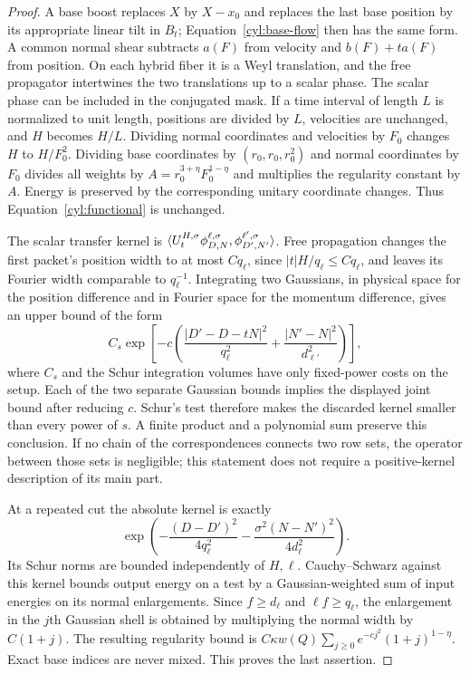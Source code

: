 \begin{proof}
A base boost replaces $X$ by $X-x_0$ and replaces the last base position
by its appropriate linear tilt in $B_t$; Equation~\eqref{cyl:base-flow}
then has the same form.  A common normal shear subtracts
$a(F)$ from velocity and $b(F)+ta(F)$ from position.  On each hybrid
fiber it is a Weyl translation, and the free propagator intertwines the
two translations up to a scalar phase.  The scalar phase can be included
in the conjugated mask.  If a time interval of length $L$ is normalized
to unit length, positions are divided by $L$, velocities are unchanged,
and $H$ becomes $H/L$.  Dividing normal coordinates and velocities by
$F_0$ changes $H$ to $H/F_0^2$.  Dividing base coordinates by
$(r_0,r_0,r_0^2)$ and normal coordinates by $F_0$ divides all weights
by $A=r_0^{3+\eta}F_0^{1-\eta}$ and multiplies the regularity constant
by $A$.  Energy is preserved by the corresponding unitary coordinate
changes.  Thus Equation~\eqref{cyl:functional} is unchanged.

The scalar transfer kernel is
$\langle U_t^{H,\sigma}\phi_{D,N}^{\ell,\sigma},\phi_{D',N'}^{\ell',\sigma}\rangle$.
Free propagation changes the first packet's position width to at most
$Cq_\ell$, since $|t|H/q_\ell\le Cq_\ell$, and leaves its Fourier
width comparable to $q_\ell^{-1}$.  Integrating two Gaussians, in physical
space for the position difference and in Fourier space for the momentum
difference, gives an upper bound of the form
\[
 C_s\exp\left[-c\left(
       \frac{|D'-D-tN|^2}{q_\ell^2}
       +\frac{|N'-N|^2}{d_{\ell'}^2}\right)\right],
\]
where $C_s$ and the Schur integration volumes have only fixed-power
costs on the setup.  Each of the two separate Gaussian bounds implies
the displayed joint bound after reducing $c$.  Schur's test therefore
makes the discarded kernel smaller than every power of $s$.  A finite
product and a polynomial sum preserve this conclusion.  If no chain of
the correspondences connects two row sets, the operator between those
sets is negligible; this statement does not require a positive-kernel
description of its main part.

At a repeated cut the absolute kernel is exactly
\[
 \exp\left(-\frac{(D-D')^2}{4q_\ell^2}
           -\frac{\sigma^2(N-N')^2}{4d_\ell^2}\right).
\]
Its Schur norms are bounded independently of $H,\ell$.  Cauchy--Schwarz
against this kernel bounds output energy on a test by a Gaussian-weighted
sum of input energies on its normal enlargements.  Since $f\ge d_\ell$
and $\ell f\ge q_\ell$, the enlargement in the $j$th Gaussian shell
is obtained by multiplying the normal width by $C(1+j)$.  The resulting
regularity bound is
$C\kappa w(Q)\sum_{j\ge0}e^{-cj^2}(1+j)^{1-\eta}$.
Exact base indices are never mixed.  This proves the last assertion.
\end{proof}

